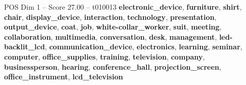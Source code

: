 \begin{textsample}{POS Dim 1 – Score 27.00 – t010013}  \label{ex:f1_pos_022}
\textbf{electronic\_device}, \textbf{furniture}, \textbf{shirt}, \textbf{chair}, \textbf{display\_device}, \textbf{interaction}, \textbf{technology}, \textbf{presentation}, \textbf{output\_device}, \textbf{coat}, \textbf{job}, \textbf{white-collar\_worker}, \textbf{suit}, \textbf{meeting}, \textbf{collaboration}, \textbf{multimedia}, \textbf{conversation}, \textbf{desk}, \textbf{management}, \textbf{led-backlit\_lcd}, \textbf{communication\_device}, \textbf{electronics}, \textbf{learning}, \textbf{seminar}, \textbf{computer}, \textbf{office\_supplies}, \textbf{training}, \textbf{television}, \textbf{company}, \textbf{businessperson}, \textbf{hearing}, \textbf{conference\_hall}, \textbf{projection\_screen}, \textbf{office\_instrument}, \textbf{lcd\_television}

\end{textsample}
